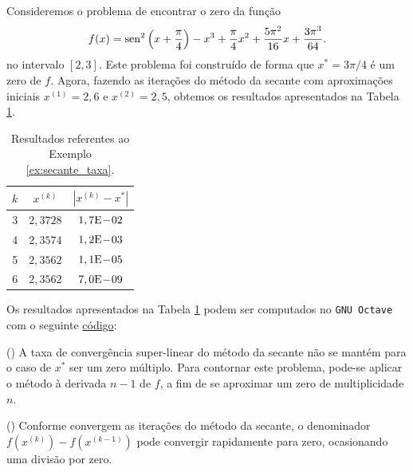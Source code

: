\begin{ex}\label{ex:secante_taxa}
  Consideremos o problema de encontrar o zero da função
  \begin{equation}
    f(x) = \operatorname{sen}^2\left(x+\frac{\pi}{4}\right) - x^3 + \frac{\pi}{4}x^2 + \frac{5\pi^2}{16}x + \frac{3\pi^3}{64}.
  \end{equation}
  no intervalo $[2,3]$. Este problema foi construído de forma que $x^* = 3\pi/4$ é um zero de $f$. Agora, fazendo as iterações do método da secante com aproximações iniciais $x^{(1)}=2,6$ e $x^{(2)}=2,5$, obtemos os resultados apresentados na Tabela \ref{tab:ex_secante_taxa}.

\begin{table}[h!]
  \centering
  \caption{Resultados referentes ao Exemplo \ref{ex:secante_taxa}.}
  \label{tab:ex_secante_taxa}
  \begin{tabular}{r|cc}
    $k$ & $x^{(k)}$ & $|x^{(k)}-x^*|$ \\\hline
    3 & $2,3728$ & $1,7\mathrm{E}\!-\!02$ \\
    4 & $2,3574$ & $1,2\mathrm{E}\!-\!03$ \\
    5 & $2,3562$ & $1,1\mathrm{E}\!-\!05$ \\
    6 & $2,3562$ & $7,0\mathrm{E}\!-\!09$ \\\hline
  \end{tabular}
\end{table}

\ifisoctave
Os resultados apresentados na Tabela \ref{tab:ex_secante_taxa} podem ser computados no \verb+GNU Octave+ com o seguinte \href{https://github.com/phkonzen/notas/blob/master/src/MatematicaNumerica/cap_eq1d/dados/ex_secante_taxa/ex_secante_taxa.m}{código}:

\fi
\end{ex}


\begin{obs}()
  A taxa de convergência super-linear do método da secante não se mantém para o caso de $x^*$ ser um zero múltiplo. Para contornar este problema, pode-se aplicar o método à derivada $n-1$ de $f$, a fim de se aproximar um zero de multiplicidade $n$.
\end{obs}

\begin{obs}()
  Conforme convergem as iterações do método da secante, o denominador $f(x^{(k)})-f(x^{(k-1)})$ pode convergir rapidamente para zero, ocasionando uma divisão por zero.
\end{obs}


